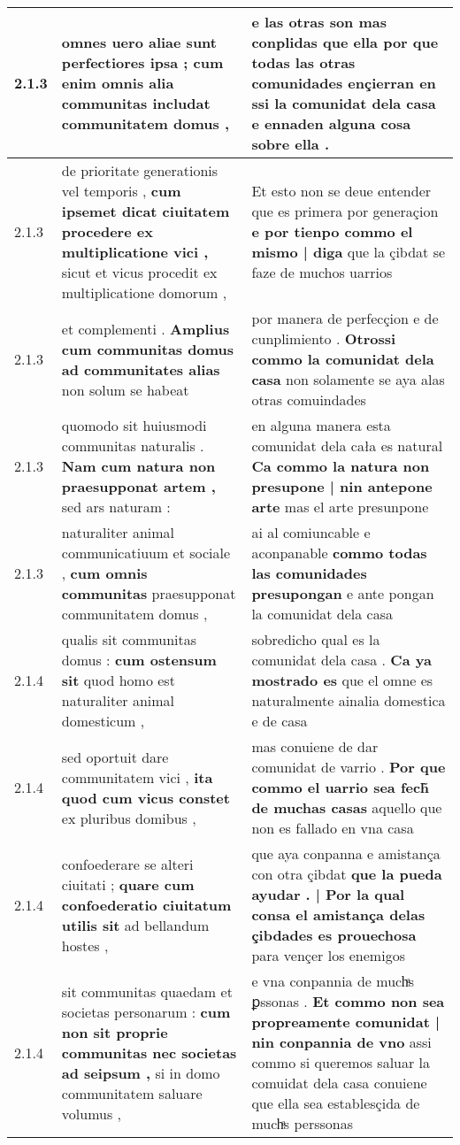\begin{tabular}{|p{1cm}|p{6.5cm}|p{6.5cm}|}
2.1.3 & omnes uero aliae sunt perfectiores ipsa ; \textbf{ cum enim omnis alia communitas } includat communitatem domus , & e las otras son mas conplidas que ella \textbf{ por que todas las otras comunidades ençierran en ssi la comunidat dela casa } e ennaden alguna cosa sobre ella . \\\hline
2.1.3 & de prioritate generationis vel temporis , \textbf{ cum ipsemet dicat ciuitatem procedere ex multiplicatione vici , } sicut et vicus procedit ex multiplicatione domorum , & Et esto non se deue entender que es primera por generaçion \textbf{ e por tienpo commo el mismo | diga } que la çibdat se faze de muchos uarrios \\\hline
2.1.3 & et complementi . \textbf{ Amplius cum communitas domus ad communitates alias } non solum se habeat & por manera de perfecçion e de cunplimiento . \textbf{ Otrossi commo la comunidat dela casa } non solamente se aya alas otras comuindades \\\hline
2.1.3 & quomodo sit huiusmodi communitas naturalis . \textbf{ Nam cum natura non praesupponat artem , } sed ars naturam : & en alguna manera esta comunidat dela cała es natural \textbf{ Ca commo la natura non presupone | nin antepone arte } mas el arte presunpone \\\hline
2.1.3 & naturaliter animal communicatiuum et sociale , \textbf{ cum omnis communitas } praesupponat communitatem domus , & ai al comiuncable e aconpanable \textbf{ commo todas las comunidades presupongan } e ante pongan la comunidat dela casa \\\hline
2.1.4 & qualis sit communitas domus : \textbf{ cum ostensum sit } quod homo est naturaliter animal domesticum , & sobredicho qual es la comunidat dela casa . \textbf{ Ca ya mostrado es } que el omne es naturalmente ainalia domestica e de casa \\\hline
2.1.4 & sed oportuit dare communitatem vici , \textbf{ ita quod cum vicus constet } ex pluribus domibus , & mas conuiene de dar comunidat de varrio . \textbf{ Por que commo el uarrio sea fech̃ de muchas casas } aquello que non es fallado en vna casa \\\hline
2.1.4 & confoederare se alteri ciuitati ; \textbf{ quare cum confoederatio ciuitatum utilis sit } ad bellandum hostes , & que aya conpanna e amistança con otra çibdat \textbf{ que la pueda ayudar . | Por la qual consa el amistança delas çibdades es prouechosa } para vençer los enemigos \\\hline
2.1.4 & sit communitas quaedam et societas personarum : \textbf{ cum non sit proprie communitas nec societas ad seipsum , } si in domo communitatem saluare volumus , & e vna conpannia de muchͣs ꝑssonas . \textbf{ Et commo non sea propreamente comunidat | nin conpannia de vno } assi commo si queremos saluar la comuidat dela casa conuiene que ella sea establesçida de muchͣs perssonas \\\hline

\end{tabular}
